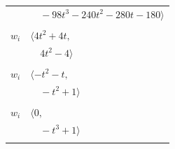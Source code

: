 \documentclass[11pt]{article}
\begin{document}
\begin{longtable}{@{}ll@{}}
 & $\quad -98t^{3}-240t^{2}-280t-180\rangle$\\
\addlinespace[2pt]
\multicolumn{2}{@{}p{0.97\textwidth}@{}}{$i=41$, $D_i=1$, $\rho_{ij}$: $7{:}2, \allowbreak 11{:}1, \allowbreak 20{:}2, \allowbreak 25{:}2, \allowbreak 29{:}2, \allowbreak 32{:}1$}\\
$w_i$ & $\langle 4t^{2}+4t,$\\
 & $\quad 4t^{2}-4\rangle$\\
\addlinespace[2pt]
\multicolumn{2}{@{}p{0.97\textwidth}@{}}{$i=42$, $D_i=1$, $\rho_{ij}$: $1{:}1, \allowbreak 7{:}1, \allowbreak 9{:}1, \allowbreak 13{:}2, \allowbreak 19{:}2$}\\
$w_i$ & $\langle -t^{2}-t,$\\
 & $\quad -t^{2}+1\rangle$\\
\addlinespace[2pt]
\multicolumn{2}{@{}p{0.97\textwidth}@{}}{$i=43$, $D_i=1$, $\rho_{ij}$: $2{:}1, \allowbreak 4{:}1, \allowbreak 5{:}1, \allowbreak 10{:}1, \allowbreak 18{:}1, \allowbreak 19{:}1$}\\
$w_i$ & $\langle 0,$\\
 & $\quad -t^{3}+1\rangle$\\
\addlinespace[2pt]
\end{longtable}
\endgroup
\end{document}
